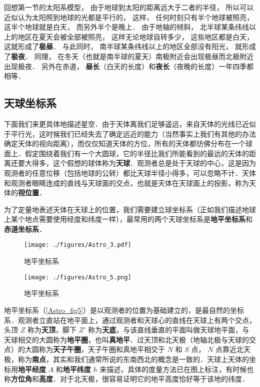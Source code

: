 回想第一节的太阳系模型， 由于地球到太阳的距离远大于二者的半径， 所以可以近似认为太阳照到地球的光都是平行的， %
这样， 任何时刻只有半个地球被照亮， 这半个地球就是白天， 而另外半个是晚上． 由于地轴的倾斜， 北半球某条纬线以上的地区在夏天会被全部被照亮， 这样无论地球自转多少， 这些地区都是白天， 这就形成了\textbf{极昼}． 与此同时， 南半球某条纬线以上的地区全部没有阳光， 就形成了\textbf{极夜}． 同理， 在冬天（也就是南半球的夏天）南极附近会出现极昼而北极附近出现极夜． 另外在赤道， \textbf{昼长}（白天的长度）和\textbf{夜长}（夜晚的长度）一年四季都相等．

\subsection{天球坐标系}

下面我们来更具体地描述星空．由于天体离我们足够遥远，来自天体的光线已近似于平行光，这时候我们已经失去了确定远近的能力（当然事实上我们有其他的办法确定天体的视向距离），而仅仅知道天体的方位，所有的天体都彷佛分布在一个球面上．假定围绕着我们有一个大圆球，它的半径比我们所能看到的最远的天体的距离还要大得多，这个假想的球体称为\textbf{天球}．观测者总是处于天球的中心，这是因为观测者的任意位移（包括地球的公转）都比天球半径小得多，可以忽略不计．天体和观测者眼睛连成的直线与天球面的交点，也就是天体在天球面上的投影，称为天体的\textbf{视位置}．

为了定量地表述天体在天球上的位置，我们需要建立球坐标系（正如我们描述地球上某个地点需要使用经度和纬度一样），最常用的两个天球坐标系是\textbf{地平坐标系}和\textbf{赤道坐标系}．

\begin{figure}[ht]
\centering
\texttt{[image: ./figures/Astro\_3.pdf]}
\caption{地平坐标系} \label{Astro_fig8}
\end{figure}

\begin{figure}[ht]
\centering
\texttt{[image: ./figures/Astro\_5.png]}
\caption{地平坐标系} \label{Astro_fig5}
\end{figure}

地平坐标系（\autoref{Astro_fig5}）是以观测者的位置为基础建立的，是最自然的坐标系．观测者立直站在地平面上，通过观测者和天球心的直线在天球上有两个交点，头顶 $Z$ 称为\textbf{天顶}，脚下 $Z'$ 称为\textbf{天底}，与该直线垂直的平面叫做天球地平面，与天球相交的大圆称为\textbf{地平圈}，也叫\textbf{真地平}．过天顶和北天极（地轴北极与天球的交点）的大圆称为\textbf{天子午圈}，天子午圈和真地平相交于 $N$ 和 $S$ 点， $N$ 点靠近北天极，称为\textbf{南点}，其实和我们通常所说的东南西北的概念是一致的．天球上天体的坐标用\textbf{地平经度} $A$ 和\textbf{地平纬度} $h$ 来描述，具体的度量方法已在图上标注，有时候也称\textbf{方位角}和\textbf{高度}．对于北天极，很容易证明它的地平高度恰好等于该地的纬度．

